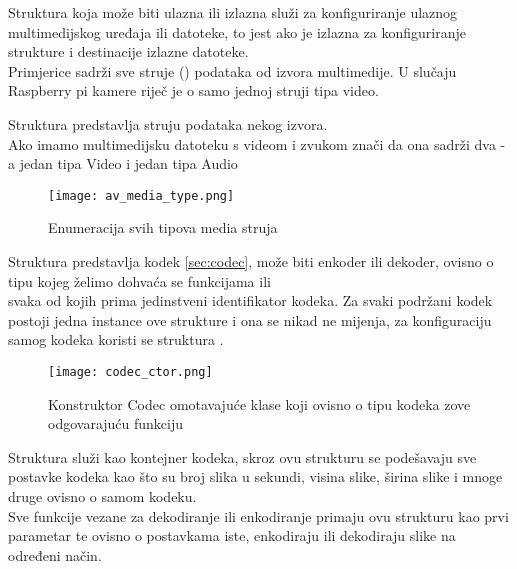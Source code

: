 \clearpage
{} \label{sec:avformat_context}
Struktura  koja može biti ulazna ili izlazna služi za konfiguriranje ulaznog multimedijskog
uređaja ili datoteke, to jest ako je izlazna za konfiguriranje strukture i destinacije izlazne datoteke. 
\\
Primjerice sadrži sve struje () podataka od izvora multimedije. U slučaju Raspberry pi kamere riječ je o samo
jednoj struji tipa video. \cite{ffmpegDocs}

 \label{sec:avstream}
Struktura  predstavlja struju podataka nekog izvora. 
\\
Ako imamo multimedijsku datoteku s videom i zvukom znači da ona sadrži dva -a jedan tipa Video i jedan
tipa Audio \cite{ffmpegDocs}
\begin{figure}[h]
  \texttt{[image: av\_media\_type.png]}
  \caption[Enumeracija svih tipova media struja]{Enumeracija svih tipova media struja \cite{ffmpegDocs}}
\end{figure}

 \label{sec:avcodec}
Struktura  predstavlja kodek \ref{sec:codec}, može biti enkoder ili dekoder, ovisno o tipu kojeg želimo dohvaća se
funkcijama  ili 
\\ 
 svaka od kojih prima jedinstveni identifikator kodeka.
\paraBreak
Za svaki podržani kodek postoji jedna instance ove strukture i ona se nikad ne mijenja, za konfiguraciju samog kodeka
koristi se struktura .

\begin{figure}[h]
  \texttt{[image: codec\_ctor.png]}
  \caption[Konstruktor Codec omotavajuće klase]{\small Konstruktor Codec omotavajuće klase koji ovisno o tipu kodeka zove odgovarajuću funkciju}
\end{figure}

\clearpage


\clearpage
{} \label{sec:avcodec_context}
Struktura  služi kao kontejner kodeka, skroz ovu strukturu se podešavaju sve postavke kodeka
kao što su broj slika u sekundi, visina slike, širina slike i mnoge druge ovisno o samom kodeku. \\
Sve funkcije vezane za dekodiranje ili enkodiranje primaju ovu strukturu kao prvi parametar te ovisno o postavkama iste,
enkodiraju ili dekodiraju slike na određeni način.


